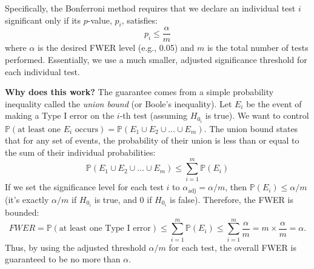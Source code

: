 \documentclass[12pt]{book}
\newcommand{\Prob}{\mathbb{P}}           %
\newcommand{\FWER}{{FWER}}  %
\newcommand{\pvalue}{$p$-value}          %
\newcommand{\Hnull}{H_0}                 %
\begin{document}
Specifically, the Bonferroni method requires that we declare an individual test $i$ significant only if its \pvalue{}, $p_i$, satisfies:
\begin{equation}
    p_i \le \frac{\alpha}{m}
\end{equation}
where $\alpha$ is the desired FWER level (e.g., 0.05) and $m$ is the total number of tests performed. Essentially, we use a much smaller, adjusted significance threshold for each individual test.

\textbf{Why does this work?} The guarantee comes from a simple probability inequality called the \emph{union bound} (or Boole's inequality). Let $E_i$ be the event of making a Type I error on the $i$-th test (assuming $\Hnull_i$ is true). We want to control $\Prob(\text{at least one } E_i \text{ occurs}) = \Prob(E_1 \cup E_2 \cup \dots \cup E_m)$. The union bound states that for any set of events, the probability of their union is less than or equal to the sum of their individual probabilities:
\begin{equation}
    \Prob(E_1 \cup E_2 \cup \dots \cup E_m) \le \sum_{i=1}^{m} \Prob(E_i)
\end{equation}
If we set the significance level for each test $i$ to $\alpha_{\text{adj}} = \alpha/m$, then $\Prob(E_i) \le \alpha/m$ (it's exactly $\alpha/m$ if $\Hnull_i$ is true, and 0 if $\Hnull_i$ is false). Therefore, the FWER is bounded:
\begin{equation}
    \FWER = \Prob(\text{at least one Type I error}) \le \sum_{i=1}^{m} \Prob(E_i) \le \sum_{i=1}^{m} \frac{\alpha}{m} = m \times \frac{\alpha}{m} = \alpha.
\end{equation}
Thus, by using the adjusted threshold $\alpha/m$ for each test, the overall FWER is guaranteed to be no more than $\alpha$.
\end{document}
